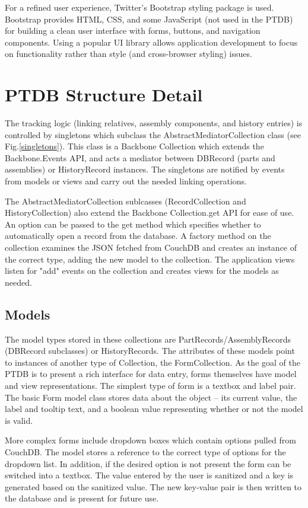 \documentclass[journal]{IEEEtran}
\begin{document}
For a refined user experience, Twitter's Bootstrap styling package is used. Bootstrap 
provides HTML, CSS, and some JavaScript (not used in the PTDB) for building a clean
user interface with forms, buttons, and navigation components. Using a popular UI 
library allows application development to focus on functionality rather than style (and
cross-browser styling) issues.

\section{PTDB Structure Detail}
The tracking logic (linking relatives, assembly components, and history entries) is controlled
by singletons which subclass the AbstractMediatorCollection class (see Fig.\ref{singletons}). This class is a Backbone Collection
which extends the Backbone.Events API, and acts a mediator between DBRecord (parts and assemblies) or
HistoryRecord instances. The singletons are notified by events from models or views and carry out the needed
linking operations.

The AbstractMediatorCollection sublcasses (RecordCollection and HistoryCollection) also extend the
Backbone Collection.get API for ease of use. An option can be passed to the get method which
specifies whether to automatically open a record from the database.
A factory method on the collection examines the JSON
fetched from CouchDB and creates an instance of the correct type, adding the new model
to the collection. The application views listen for "add" events on the collection and creates views
for the models as needed.

\subsection{Models}

The model types stored in these collections are PartRecords/AssemblyRecords (DBRecord subclasses) or HistoryRecords.
The attributes of these models point to instances of another type of Collection,
the FormCollection. As the goal of the PTDB is to present a rich interface for data entry, forms
themselves have model and view representations. The simplest type of form is a textbox and label 
pair. The basic Form model class stores data about the object -- its current value, the label and tooltip text,
and a boolean value representing whether or not the model is valid.

More complex forms include dropdown boxes which contain options pulled from CouchDB. The model
stores a reference to the correct type of options for the dropdown list. In addition, if the 
desired option is not present the form can be switched into a textbox. The value entered by
the user is sanitized and a key is generated based on the sanitized value. The new key-value
pair is then written to the database and is present for future use.
\end{document}
